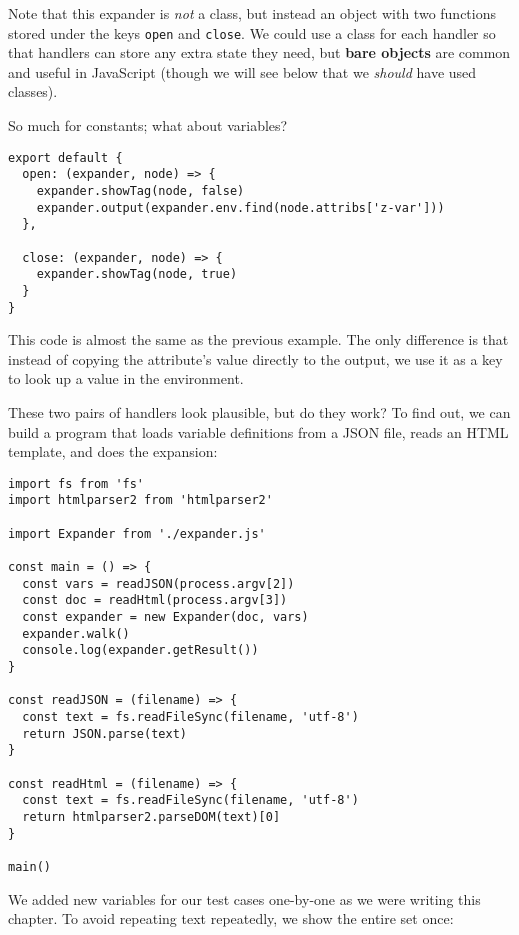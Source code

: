 \documentclass[krantzl]{krantz}
\newcommand{\glossref}[1]{\textbf{#1}}
\begin{document}
Note that this expander is \emph{not} a class,
but instead an object with two functions stored under the keys \texttt{open} and \texttt{close}.
We could use a class for each handler
so that handlers can store any extra state they need,
but \glossref{bare objects} are common and useful in JavaScript
(though we will see below that we \emph{should} have used classes).


So much for constants; what about variables?


\begin{lstlisting}[frame=tblr]
export default {
  open: (expander, node) => {
    expander.showTag(node, false)
    expander.output(expander.env.find(node.attribs['z-var']))
  },

  close: (expander, node) => {
    expander.showTag(node, true)
  }
}
\end{lstlisting}



\noindent This code is almost the same as the previous example.
The only difference is that instead of copying the attribute’s value
directly to the output,
we use it as a key to look up a value in the environment.


These two pairs of handlers look plausible, but do they work?
To find out,
we can build a program that loads variable definitions from a JSON file,
reads an HTML template,
and does the expansion:


\begin{lstlisting}[frame=tblr]
import fs from 'fs'
import htmlparser2 from 'htmlparser2'

import Expander from './expander.js'

const main = () => {
  const vars = readJSON(process.argv[2])
  const doc = readHtml(process.argv[3])
  const expander = new Expander(doc, vars)
  expander.walk()
  console.log(expander.getResult())
}

const readJSON = (filename) => {
  const text = fs.readFileSync(filename, 'utf-8')
  return JSON.parse(text)
}

const readHtml = (filename) => {
  const text = fs.readFileSync(filename, 'utf-8')
  return htmlparser2.parseDOM(text)[0]
}

main()
\end{lstlisting}



We added new variables for our test cases one-by-one
as we were writing this chapter.
To avoid repeating text repeatedly,
we show the entire set once:
\end{document}
